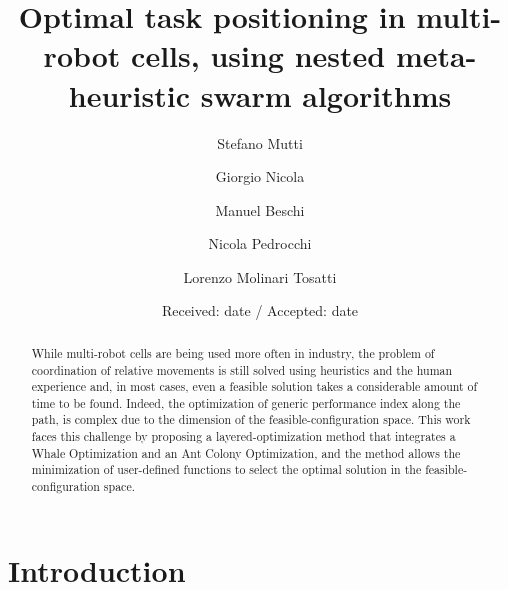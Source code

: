 \documentclass[twocolumn]{svjour3}
\begin{document}
	
	\title{Optimal task positioning in multi-robot cells, using nested meta-heuristic swarm algorithms}
	
	
	\author{Stefano Mutti    \and
			Giorgio Nicola 	\and
			Manuel Beschi	\and
		    Nicola Pedrocchi \and
		    Lorenzo Molinari Tosatti
	}
	
	
	
	\date{Received: date / Accepted: date}
	
	
  
  
    \maketitle
    

\begin{abstract}
While multi-robot cells are being used more often in industry, the problem of coordination of relative movements is still solved using heuristics and the human experience and,  in most cases, even a feasible solution takes a considerable amount of time to be found. Indeed, the optimization of generic performance index along the path, is complex due to the dimension of the feasible-configuration space. 
This work faces this challenge by proposing a layered-optimization method that integrates a Whale Optimization and an Ant Colony Optimization, and the method allows the minimization of user-defined functions to select the optimal solution in the feasible-configuration space.
\end{abstract}






\section{Introduction}
\label{introduction}
\end{document}
